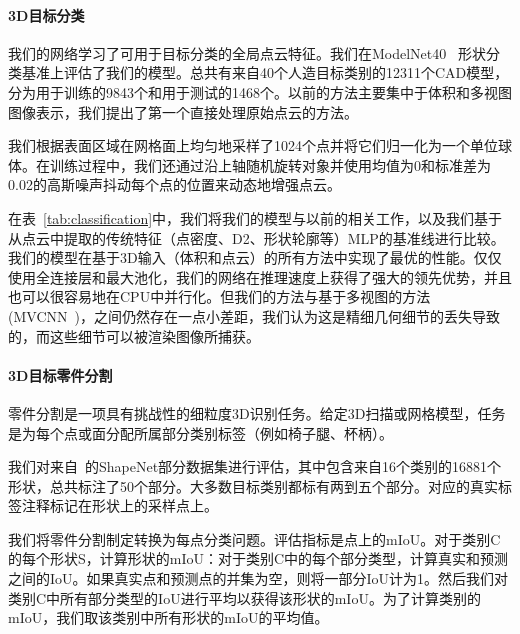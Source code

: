 \paragraph{3D目标分类} 我们的网络学习了可用于目标分类的全局点云特征。我们在ModelNet40~\cite{wu20153d} 形状分类基准上评估了我们的模型。总共有来自40个人造目标类别的12311个CAD模型，分为用于训练的9843个和用于测试的1468个。以前的方法主要集中于体积和多视图图像表示，我们提出了第一个直接处理原始点云的方法。

我们根据表面区域在网格面上均匀地采样了1024个点并将它们归一化为一个单位球体。在训练过程中，我们还通过沿上轴随机旋转对象并使用均值为0和标准差为0.02的高斯噪声抖动每个点的位置来动态地增强点云。


在表~\ref{tab:classification}中，我们将我们的模型与以前的相关工作，以及我们基于从点云中提取的传统特征（点密度、D2、形状轮廓等）MLP的基准线进行比较。我们的模型在基于3D输入（体积和点云）的所有方法中实现了最优的性能。仅仅使用全连接层和最大池化，我们的网络在推理速度上获得了强大的领先优势，并且也可以很容易地在CPU中并行化。但我们的方法与基于多视图的方法 (MVCNN~\cite{su15mvcnn})，之间仍然存在一点小差距，我们认为这是精细几何细节的丢失导致的，而这些细节可以被渲染图像所捕获。

\paragraph{3D目标零件分割} 零件分割是一项具有挑战性的细粒度3D识别任务。给定3D扫描或网格模型，任务是为每个点或面分配所属部分类别标签（例如椅子腿、杯柄）。


我们对来自~\cite{Yi16}的ShapeNet部分数据集进行评估，其中包含来自16个类别的16881个形状，总共标注了50个部分。大多数目标类别都标有两到五个部分。对应的真实标签注释标记在形状上的采样点上。

我们将零件分割制定转换为每点分类问题。评估指标是点上的mIoU。对于类别C的每个形状S，计算形状的mIoU：对于类别C中的每个部分类型，计算真实和预测之间的IoU。如果真实点和预测点的并集为空，则将一部分IoU计为1。然后我们对类别C中所有部分类型的IoU进行平均以获得该形状的mIoU。为了计算类别的mIoU，我们取该类别中所有形状的mIoU的平均值。

